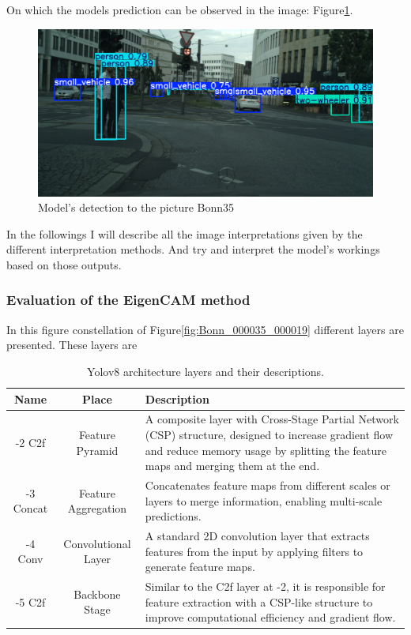 On which the models prediction can be observed in the image: Figure\ref{fig:detbonn35}.
\begin{figure}[h]
    \centering
    \includegraphics[width=1\linewidth]{figures/bonn_000035_000019_leftImg8bit}
    \caption{Model's detection to the picture Bonn35 }
    \label{fig:detbonn35}
\end{figure}

In the followings I will describe all the image interpretations given by the different interpretation methods. And try and interpret the model's workings based on those outputs.

\newpage

\subsubsection{Evaluation of the EigenCAM method}\label{subsubsec:evaluation-of-the-eigencam-method}

In this figure constellation of Figure\ref{fig:Bonn_000035_000019} different layers are presented.
These layers are

\begin{table}[h]
    \centering
    \begin{tabular}{|c|c|p{10cm}|}
        \hline
        \textbf{Name} & \textbf{Place} & \textbf{Description} \\
         \hline
         -2 C2f  & Feature Pyramid & A composite layer with Cross-Stage Partial Network (CSP) structure, designed to increase gradient flow and reduce memory usage by splitting the feature maps and merging them at the end. \\
         \hline
         -3 Concat & Feature Aggregation & Concatenates feature maps from different scales or layers to merge information, enabling multi-scale predictions. \\
         \hline
         -4 Conv & Convolutional Layer & A standard 2D convolution layer that extracts features from the input by applying filters to generate feature maps. \\
         \hline
         -5 C2f  & Backbone Stage & Similar to the C2f layer at -2, it is responsible for feature extraction with a CSP-like structure to improve computational efficiency and gradient flow. \\
         \hline
    \end{tabular}
    \caption{Yolov8 architecture layers and their descriptions.}
    \label{tab:yolov8_layers}
\end{table}

